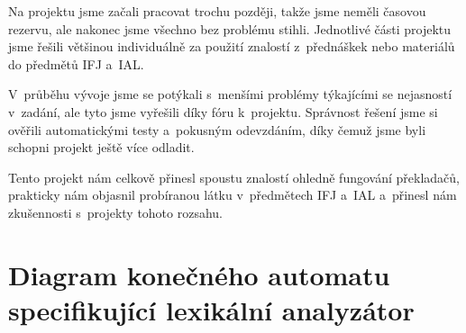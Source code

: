 \documentclass[a4paper, 11pt]{article}
\begin{document}
	Na projektu jsme začali pracovat trochu později, takže jsme neměli časovou rezervu, ale nakonec
	jsme všechno bez problému stihli. Jednotlivé části projektu jsme řešili většinou individuálně za použití
	znalostí z~přednáškek nebo materiálů do předmětů IFJ a~IAL.

	V~průběhu vývoje jsme se potýkali s~menšími problémy týkajícími se nejasností v~zadání, ale
	tyto jsme vyřešili díky fóru k~projektu. Správnost řešení jsme si ověřili automatickými
	testy a~pokusným odevzdáním, díky čemuž jsme byli schopni projekt ještě více odladit.

	Tento projekt nám celkově přinesl spoustu znalostí ohledně fungování překladačů, prakticky nám
	objasnil probíranou látku v~předmětech IFJ a~IAL a~přinesl nám zkušennosti s~projekty tohoto rozsahu.



	\clearpage
	
	\renewcommand{\refname}{Literatura}
	


	\clearpage
	\appendix

	\section{Diagram konečného automatu specifikující lexikální analyzátor}
\end{document}
